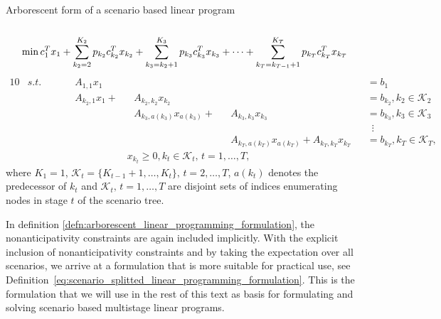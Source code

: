 \begin{defn}{Arborescent form of a scenario based linear program}
\label{defn:arborescent_linear_programming_formulation}
\\
\cite[p. 3]{dupacova_scenarios_for_multistage_stochastic_programs}
\\
\footnotesize
\begin{equation}
\mathrm{min} \, c_1^Tx_1 + \sum_{k_2=2}^{K_2}p_{k_2}c_{k_2}^Tx_{k_2} + \sum_{k_3=k_2+1}^{K_3}p_{k_3}c_{k_3}^Tx_{k_3} + \dots +  \sum_{k_T=k_{T-1}+1}^{K_T}p_{k_T}c_{k_T}^Tx_{k_T} \\
\end{equation}
\vspace{-0.5cm}
\begin{alignat}{10}
& s.t. && \, && A_{1,1}x_1 && && \,&&=b_1 \nonumber \\
& && && A_{k_2,1}x_1  + &&A_{k_2,k_2}x_{k_2} && &&=b_{k_2}, k_2 \in \mathcal{K}_2 \nonumber \\
& && && && A_{k_3,a(k_3)}x_{a(k_3)}  + && A_{k_3,k_3}x_{k_3} &&=b_{k_3} , k_3 \in \mathcal{K}_3 \nonumber \\
& && && && && &&  \, \, \, \vdots \nonumber \\
& && && && && A_{k_T,a(k_T)}x_{a(k_T)}  +  A_{k_T,k_T}x_{k_T} &&=b_{k_T} , k_T \in \mathcal{K}_T, \nonumber
\end{alignat}
\vspace{-0.5cm}
\begin{align*}
& x_{k_t} \geq 0, k_t \in \mathcal{K}_t, \, t=1,\dots,T,  \nonumber
\end{align*}
\normalsize
where $K_1=1$, $\mathcal{K}_t=\{K_{t-1}+1,\dots,K_t\}, \, t=2,\dots,T$, $a(k_t)$ denotes the predecessor of $k_t$ and $\mathcal{K}_t, \, t=1,\dots,T$ are disjoint sets of indices enumerating nodes in stage $t$ of the scenario tree.
\end{defn}
In definition \ref{defn:arborescent_linear_programming_formulation}, the nonanticipativity constraints are again included implicitly. With the explicit inclusion of nonanticipativity constraints and by taking the expectation over all scenarios, we arrive at a formulation that is more suitable for practical use, see Definition~\ref{eq:scenario_splitted_linear_programming_formulation}. This is the formulation that we will use in the rest of this text as basis for formulating and solving scenario based multistage linear programs.
\newpage
